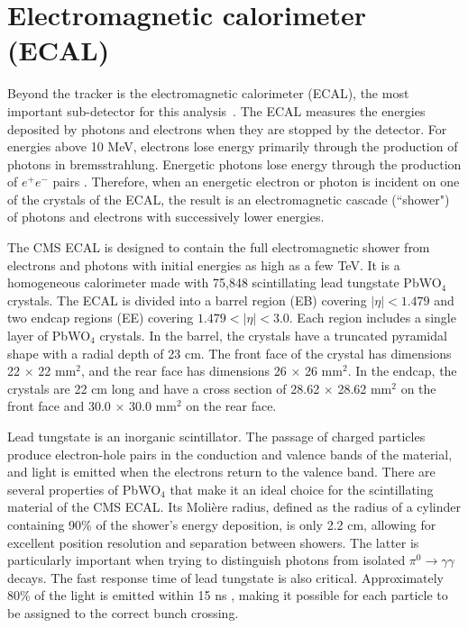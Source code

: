 

\section{Electromagnetic calorimeter (ECAL)}
\label{sec:ECAL}

Beyond the tracker is the electromagnetic calorimeter (ECAL), the most important sub-detector for this analysis~\cite{ECAL_TDR,ECAL_TDRAddendum}. The ECAL measures the energies deposited by photons and electrons when they are stopped by the detector. For energies above 10 MeV, electrons lose energy primarily through the production of photons in bremsstrahlung. Energetic photons lose energy through the production of $e^+e^-$ pairs \cite{Calo}. Therefore, when an energetic electron or photon is incident on one of the crystals of the ECAL, the result is an electromagnetic cascade (``shower") of photons and electrons with successively lower energies.

The CMS ECAL is designed to contain the full electromagnetic shower from electrons and photons with initial energies as high as a few TeV. It is a homogeneous calorimeter made with 75,848 scintillating lead tungstate PbWO$_4$ crystals. The ECAL is divided into a barrel region (EB) covering $|\eta| < 1.479$ and two endcap regions (EE) covering $1.479 < |\eta| < 3.0$.  Each region includes a single layer of PbWO$_4$ crystals. In the barrel, the crystals have a truncated pyramidal shape with a radial depth of 23 cm. The front face of the crystal has dimensions 22 $\times$ 22 mm$^2$, and the rear face has dimensions 26 $\times$ 26 mm$^2$. In the endcap, the crystals are 22 cm long and have a cross section of 28.62 $\times$ 28.62 mm$^2$ on the front face and 30.0 $\times$ 30.0 mm$^2$ on the rear face. 

Lead tungstate is an inorganic scintillator. The passage of charged particles produce electron-hole pairs in the conduction and valence bands of the material, and light is emitted when the electrons return to the valence band. There are several properties of PbWO$_4$ that make it an ideal choice for the scintillating material of the CMS ECAL. Its Moli\`{e}re radius, defined as the radius of a cylinder containing 90\% of the shower's energy deposition, is only 2.2 cm, allowing for excellent position resolution and separation between showers. The latter is particularly important when trying to distinguish photons from isolated $\pi^0\rightarrow\gamma\gamma$ decays. The fast response time of lead tungstate is also critical. Approximately 80\% of the light is emitted within 15 ns \cite{Calo}, making it possible for each particle to be assigned to the correct bunch crossing. 

